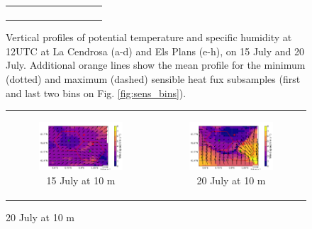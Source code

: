 \begin{figure}[hbtp]
{\begin{tabular}{@{}cccc@{}}
\begin{subfigure}[t]{0.29\textwidth}
        \end{subfigure} \\
    \end{tabular}
    }
    \caption{Vertical profiles of potential temperature and specific humidity at 12UTC at La Cendrosa (a-d) and Els Plans (e-h), on 15 July and 20 July. Additional orange lines show the mean profile for the minimum (dotted) and maximum (dashed) sensible heat fux subsamples (first and last two bins on Fig. \ref{fig:sens_bins}).}
    \label{fig:profiles_theta_ovap_sensbins}
\end{figure}

\begin{figure}[hbtp]
    \centering
    \begin{tabular}{cc}
        \begin{subfigure}[t]{0.5\textwidth}
            \caption{15 July at 10 m}
            \includegraphics[width=\textwidth]{images/chap6/IOP_maps/mesoNH_wind_10m_2021-07-15T12:00:00.png}
        \end{subfigure} &
        \begin{subfigure}[t]{0.5\textwidth}
            \caption{20 July at 10 m}
            \includegraphics[width=\textwidth]{images/chap6/IOP_maps/mesoNH_wind_10m_2021-07-20T12:00:00.png}

\end{subfigure}
\end{tabular}
\end{figure}
